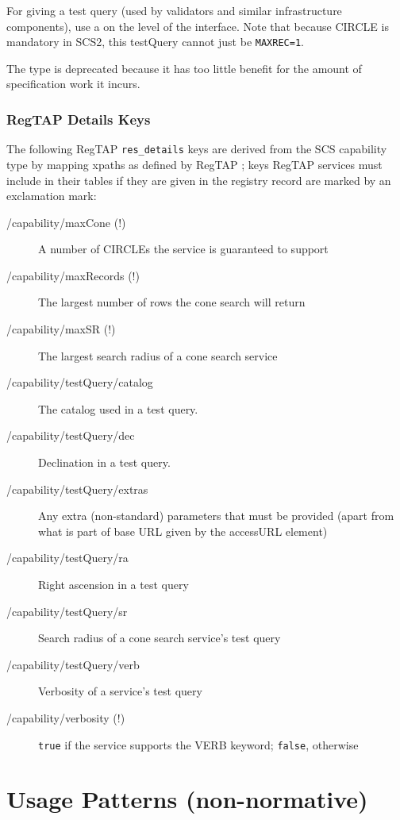 \documentclass[11pt,a4paper]{ivoa}
\begin{document}

For giving a test query (used by validators and similar infrastructure
components), use a  on the level of the
 interface.  Note that because CIRCLE is mandatory
in SCS2, this testQuery cannot just be \verb|MAXREC=1|.

The  type is deprecated because it has too little
benefit for the amount of specification work it incurs.

\subsubsection{RegTAP Details Keys}

The following RegTAP \verb|res_details| keys are derived from the SCS
capability type by mapping xpaths as defined by RegTAP
\citep{2024ivoa.spec.1002D}; keys RegTAP
services must include in their tables if they are given in the registry
record are marked by an exclamation mark:

\begin{description}
\item[/capability/maxCone (!)] A number of CIRCLEs the service is
guaranteed to support
\item[/capability/maxRecords (!)]The largest number of rows the cone
search will return
\item[/capability/maxSR (!)]The largest search radius of a cone search service
\item[/capability/testQuery/catalog]The catalog used in a test query.
\item[/capability/testQuery/dec]Declination in a test query.
\item[/capability/testQuery/extras]Any extra (non-standard) parameters
that must be provided (apart from what is part of base URL given by the
accessURL element)
\item[/capability/testQuery/ra]Right ascension in a test query
\item[/capability/testQuery/sr]Search radius of a cone search service's test query
\item[/capability/testQuery/verb]Verbosity of a service's test query
\item[/capability/verbosity (!)]\texttt{true} if the service supports the VERB keyword; \texttt{false}, otherwise
\end{description}


\appendix
\section{Usage Patterns (non-normative)}
\end{document}
